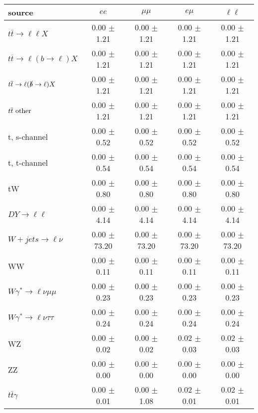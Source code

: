 \begin{tabular}{l|cccc} \hline\hline
source & $ee$ & $\mu\mu$ & $e\mu$ & $\ell\ell $ \\
\hline
$t\overline{t} \rightarrow \ell \ell X$ &  0.00 $\pm$  1.21 &  0.00 $\pm$  1.21 &  0.00 $\pm$  1.21 &  0.00 $\pm$  1.21 \\
$t\overline{t} \rightarrow \ell (b \rightarrow \ell) X$ &  0.00 $\pm$  1.21 &  0.00 $\pm$  1.21 &  0.00 $\pm$  1.21 &  0.00 $\pm$  1.21 \\
$t\overline{t} \rightarrow \ell (\slashed b \rightarrow \ell) X$ &  0.00 $\pm$  1.21 &  0.00 $\pm$  1.21 &  0.00 $\pm$  1.21 &  0.00 $\pm$  1.21 \\
        $t\overline{t}\ \rm{other}$ &  0.00 $\pm$  1.21 &  0.00 $\pm$  1.21 &  0.00 $\pm$  1.21 &  0.00 $\pm$  1.21 \\
\hline
                       t, s-channel &  0.00 $\pm$  0.52 &  0.00 $\pm$  0.52 &  0.00 $\pm$  0.52 &  0.00 $\pm$  0.52 \\
                       t, t-channel &  0.00 $\pm$  0.54 &  0.00 $\pm$  0.54 &  0.00 $\pm$  0.54 &  0.00 $\pm$  0.54 \\
                                 tW &  0.00 $\pm$  0.80 &  0.00 $\pm$  0.80 &  0.00 $\pm$  0.80 &  0.00 $\pm$  0.80 \\
\hline
         $DY \rightarrow \ell \ell$ &  0.00 $\pm$  4.14 &  0.00 $\pm$  4.14 &  0.00 $\pm$  4.14 &  0.00 $\pm$  4.14 \\
      $W+jets \rightarrow \ell \nu$ &  0.00 $\pm$ 73.20 &  0.00 $\pm$ 73.20 &  0.00 $\pm$ 73.20 &  0.00 $\pm$ 73.20 \\
                                 WW &  0.00 $\pm$  0.11 &  0.00 $\pm$  0.11 &  0.00 $\pm$  0.11 &  0.00 $\pm$  0.11 \\
\hline
$W\gamma^{*} \rightarrow \ell \nu \mu\mu$ &  0.00 $\pm$  0.23 &  0.00 $\pm$  0.23 &  0.00 $\pm$  0.23 &  0.00 $\pm$  0.23 \\
$W\gamma^{*} \rightarrow \ell \nu \tau\tau$ &  0.00 $\pm$  0.24 &  0.00 $\pm$  0.24 &  0.00 $\pm$  0.24 &  0.00 $\pm$  0.24 \\
                                 WZ &  0.00 $\pm$  0.02 &  0.00 $\pm$  0.02 &  0.02 $\pm$  0.03 &  0.02 $\pm$  0.03 \\
                                 ZZ &  0.00 $\pm$  0.00 &  0.00 $\pm$  0.00 &  0.00 $\pm$  0.00 &  0.00 $\pm$  0.00 \\
\hline
              $t\overline{t}\gamma$ &  0.00 $\pm$  0.01 &  0.00 $\pm$  1.08 &  0.02 $\pm$  0.01 &  0.02 $\pm$  0.01 \\

\end{tabular}
